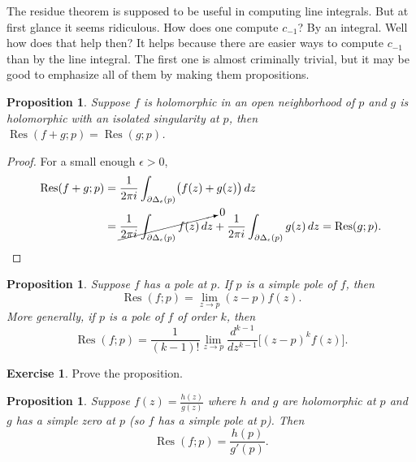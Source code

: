 \documentclass[12pt,openany]{book}
\theoremstyle{plain}
\newtheorem{prop}[thm]{Proposition}
\theoremstyle{remark}
\theoremstyle{definition}
\newenvironment{exbox}{%
    \def\FrameCommand{\vrule width 1pt \relax\hspace{10pt}}%
    \MakeFramed{\advance\hsize-\width\FrameRestore}%
}{%
    \endMakeFramed
}
\theoremstyle{exercise}
\newtheorem{exercise}{Exercise}[section]
\theoremstyle{example}
\begin{document}
The residue theorem is supposed to be useful in computing line integrals.
But at first glance it seems ridiculous.  How does one compute $c_{-1}$?  By
an integral.  Well how does that help then?  It helps because there are
easier ways to compute $c_{-1}$ than by the line integral.  The first one is
almost criminally trivial, but it may be good to emphasize all of them
by making them propositions.

\begin{prop}
Suppose $f$ is holomorphic in an open neighborhood of $p$ and $g$ is holomorphic
with an isolated singularity at $p$, then
$\operatorname{Res}(f+g;p) = \operatorname{Res}(g;p)$.
\end{prop}

\begin{proof}
For a small enough $\epsilon > 0$,
\begin{equation*}
\begin{split}
\operatorname{Res}(f+g;p)
& =
\frac{1}{2\pi i}
\int_{\partial \Delta_{\epsilon}(p)}
\bigl(f(z)+g(z)\bigr) \, dz
\\
& =
\cancelto{0}{
\frac{1}{2\pi i}
\int_{\partial \Delta_{\epsilon}(p)}
f(z) \, dz
}
+
\frac{1}{2\pi i}
\int_{\partial \Delta_{\epsilon}(p)}
g(z) \, dz
=
\operatorname{Res}(g;p) . \qedhere
\end{split}
\end{equation*}
\end{proof}

\begin{prop}
Suppose $f$ has a pole at $p$.
If $p$ is a simple pole of $f$, then
\begin{equation*}
\operatorname{Res}(f;p) = \lim_{z\to p} (z-p) f(z) .
\end{equation*}
More generally, if $p$ is a pole of $f$ of order $k$, then
\begin{equation*}
\operatorname{Res}(f;p) = \frac{1}{(k-1)!} \lim_{z\to p}
\frac{d^{k-1}}{dz^{k-1}}\bigl[ (z-p)^{k} f(z) \bigr] .
\end{equation*}
\end{prop}

\begin{exbox}
\begin{exercise}
Prove the proposition.
\end{exercise}
\end{exbox}

\begin{prop} \label{prop:residuesimpleratio}
Suppose $f(z) = \frac{h(z)}{g(z)}$ where $h$ and $g$ are holomorphic
at $p$ and $g$ has a simple zero at $p$ (so $f$ has a simple pole at $p$).
Then
\begin{equation*}
\operatorname{Res}(f;p) = \frac{h(p)}{g'(p)} .
\end{equation*}
\end{prop}
\end{document}
